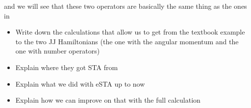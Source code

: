 and we will see that these two operators are basically the same thing as the ones in  \cite{FastGenerationJulia2012}
\newpage
\begin{itemize}
	\item Write down the calculations that allow us to get from the textbook example to the two JJ Hamiltonians (the one with the angular momentum and the one with number operators)
	\item Explain where they got STA from
	\item Explain what we did with eSTA up to now
	\item Explain how we can improve on that with the full calculation
\end{itemize}
\newpage
